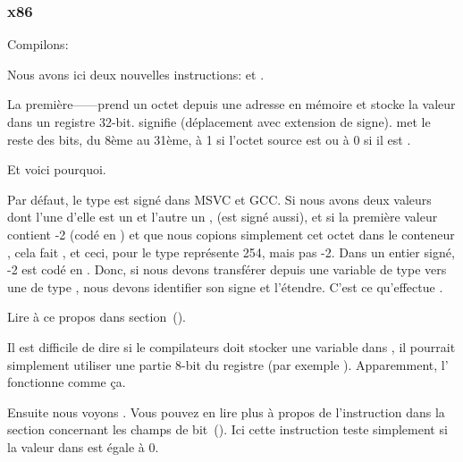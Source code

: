 \subsubsection{x86}


Compilons:




Nous avons ici deux nouvelles instructions: \MOVSX et \TEST.

\label{MOVSX}

La première---\MOVSX---prend un octet depuis une adresse en mémoire et stocke la
valeur dans un registre 32-bit. 
\MOVSX signifie  (déplacement avec extension de signe).
\MOVSX met le reste des bits, du 8ème au 31ème, à 1 si l'octet source est 
ou à 0 si il est .

Et voici pourquoi.

Par défaut, le type \Tchar est signé dans MSVC et GCC. Si nous avons deux valeurs
dont l'une d'elle est un \Tchar et l'autre un \Tint, (\Tint est signé aussi), et
si la première valeur contient -2 (codé en ) et que nous copions simplement
cet octet dans le conteneur \Tint, cela fait , et ceci, pour le type
\Tint représente 254, mais pas -2. Dans un entier signé, -2 est codé en .
Donc, si nous devons transférer  depuis une variable de type \Tchar vers
une de type \Tint, nous devons identifier son signe et l'étendre. C'est ce qu'effectue
\MOVSX.

Lire à ce propos dans \q{\IT{\SignedNumbersSectionName}} section~().

Il est difficile de dire si le compilateurs doit stocker une variable \Tchar dans
\EDX, il pourrait simplement utiliser une partie 8-bit du registre (par exemple \DL).
Apparemment, l' fonctionne comme
ça.


Ensuite nous voyons .
Vous pouvez en lire plus à propos de l'instruction \TEST dans la section concernant
les champs de bit~().
Ici cette instruction teste simplement si la valeur dans \EDX est égale à 0.


